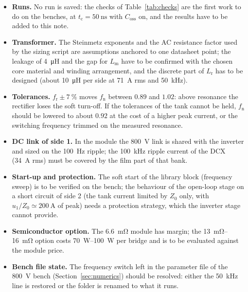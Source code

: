 \documentclass[12pt,a4paper]{scrartcl}
\newcommand{\ped}[1]{_{\mathrm{#1}}}
\begin{document}
\begin{onehalfspace}
\begin{itemize}[nosep]
	\item \textbf{Runs.} No run is saved: the checks of Table~\ref{tab:checks} are the first work to do on the benches, at $t\ped{c} = \SI{50}{\nano\second}$ with $C\ped{oss}$ on, and the results have to be added to this note.
	\item \textbf{Transformer.} The Steinmetz exponents and the AC resistance factor used by the sizing script are assumptions anchored to one datasheet point; the leakage of \SI{4}{\micro\henry} and the gap for $L\ped{m}$ have to be confirmed with the chosen core material and winding arrangement, and the discrete part of $L\ped{r}$ has to be designed (about \SI{10}{\micro\henry} per side at \SI{71}{\ampere} rms and \SI{50}{\kilo\hertz}).
	\item \textbf{Tolerances.} $f\ped{r} \pm \SI{7}{\percent}$ moves $f\ped{n}$ between $0.89$ and $1.02$: above resonance the rectifier loses the soft turn-off. If the tolerances of the tank cannot be held, $f\ped{n}$ should be lowered to about $0.92$ at the cost of a higher peak current, or the switching frequency trimmed on the measured resonance.
	\item \textbf{DC link of side 1.} In the module the \SI{800}{\volt} link is shared with the inverter and sized on the \SI{100}{\hertz} ripple; the \SI{100}{\kilo\hertz} ripple current of the DCX (\SI{34}{\ampere} rms) must be covered by the film part of that bank.
	\item \textbf{Start-up and protection.} The soft start of the library block (frequency sweep) is to be verified on the bench; the behaviour of the open-loop stage on a short circuit of side 2 (the tank current limited by $Z\ped{0}$ only, with $u\ped{1}/Z\ped{0} \simeq \SI{200}{\ampere}$ of peak) needs a protection strategy, which the inverter stage cannot provide.
	\item \textbf{Semiconductor option.} The \SI{6.6}{\milli\ohm} module has margin; the \SIrange{13}{16}{\milli\ohm} option costs \SIrange{70}{100}{\watt} per bridge and is to be evaluated against the module price.
	\item \textbf{Bench file state.} The frequency switch left in the parameter file of the \SI{800}{\volt} bench (Section~\ref{sec:numerics}) should be resolved: either the \SI{50}{\kilo\hertz} line is restored or the folder is renamed to what it runs.
\end{itemize}


\end{onehalfspace}
\end{document}
